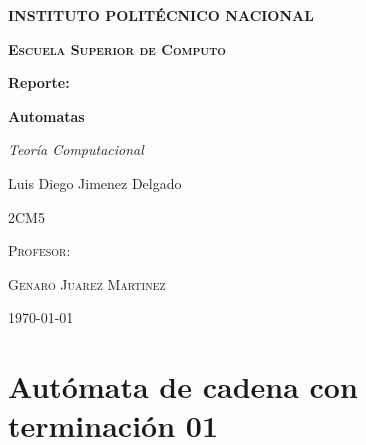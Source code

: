 \documentclass[11pt,a4paper]{report}
\begin{document}
	\begin{titlepage}
		\centering
		{\scshape\huge\bfseries INSTITUTO POLITÉCNICO NACIONAL \par}
		\vspace{0.7cm}
		{\scshape\LARGE\bfseries Escuela Superior de Computo \par}
		\vspace{0.5cm}
		{\scshape\Large \par}
		\vspace{1.5cm}
		{\Large\bfseries Reporte: \par}
		{\huge\bfseries Automatas \par}
		\vspace{2cm}
		{\LARGE\itshape Teoría Computacional\par}
		\vspace{0.2cm}
		{\Large Luis Diego Jimenez Delgado\par}
		\vfill
			{\scshape\Large 2CM5 \par}
			\vspace{0.5cm}
			{\scshape\large Profesor: \par}
			{\scshape\Large Genaro Juarez Martinez \par}
		\vfill
		{\large \today}
	\end{titlepage}
 
	\tableofcontents{}

	\chapter{Autómata de cadena con terminación 01}
\end{document}
